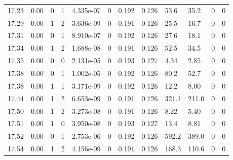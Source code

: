 \documentclass[preview]{standalone}
\begin{document}
{{{{{{{{{{{{{\begin{tabular}{L{1.2cm}C{1.2cm} C{0.3cm}C{0.5cm} C{1.4cm}C{1.4cm} C{1.4cm}C{1.4cm} C{1.6cm}C{1.6cm} C{1.6cm}C{1.6cm}}
  17.23  &  0.00  & 0     &  1 &  4.335e-07  & 0  &  0.192&   0.126& 53.6 & 35.2   &  0 & 0  \\ 
  17.29  &  0.00  & 1     &  2 &  3.636e-09  & 0  &  0.191&   0.126& 25.5 & 16.7   &  0 & 0  \\ 
  17.31  &  0.00  & 0     &  1 &  8.910e-07  & 0  &  0.192&   0.126& 27.6 & 18.1   &  0 & 0  \\ 
  17.34  &  0.00  & 1     &  2 &  1.688e-08  & 0  &  0.191&   0.126& 52.5 & 34.5   &  0 & 0  \\ 
  17.35  &  0.00  & 0     &  0 &  2.131e-05  & 0  &  0.193&   0.127& 4.34 & 2.85   &  0 & 0  \\ 
  17.38  &  0.00  & 0     &  1 &  1.002e-05  & 0  &  0.192&   0.126& 80.2 & 52.7   &  0 & 0  \\ 
  17.38  &  0.00  & 1     &  1 &  3.171e-09  & 0  &  0.192&   0.126& 12.2 & 8.00   &  0 & 0  \\ 
  17.44  &  0.00  & 1     &  2 &  6.653e-09  & 0  &  0.191&   0.126& 321.1 & 211.0   &  0 & 0  \\ 
  17.50  &  0.00  & 1     &  2 &  3.273e-08  & 0  &  0.191&   0.126& 8.22 & 5.40   &  0 & 0  \\ 
  17.51  &  0.00  & 1     &  0 &  3.950e-08  & 0  &  0.193&   0.127& 13.4 & 8.81   &  0 & 0  \\ 
  17.52  &  0.00  & 0     &  1 &  2.753e-06  & 0  &  0.192&   0.126& 592.2 & 389.0   &  0 & 0  \\ 
  17.54  &  0.00  & 1     &  2 &  4.156e-09  & 0  &  0.191&   0.126& 168.3 & 110.6   &  0 & 0  \\ 
\hline 
\end{tabular} 

}}}}}}}}}}}}}
\end{document}
